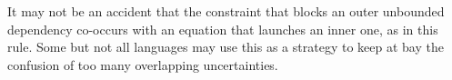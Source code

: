 \documentclass[output=paper,hidelinks]{langscibook}
\begin{document}
\ea \label{ubdq}
\z

\noindent  It may not be an accident that the constraint that blocks an outer unbounded dependency co-occurs with an equation that launches an inner one, as in this rule. Some but not all languages may use this as a strategy to keep at bay the confusion of too many overlapping uncertainties.


\end{document}
